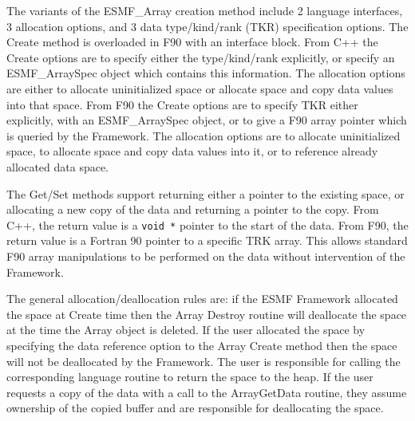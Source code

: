 

The variants of the ESMF\_Array creation method include 2 language interfaces, 
3 allocation options, and 3 data type/kind/rank (TKR) specification options.  
The Create method is overloaded in F90 with an interface block.
From C++ the Create options are to specify
either the type/kind/rank explicitly, or specify an ESMF\_ArraySpec
object which contains this information.  The allocation options 
are either to allocate uninitialized space or allocate space and
copy data values into that space.  
From F90 the Create options
are to specify TKR either explicitly, with an ESMF\_ArraySpec
object, or to give a F90 array pointer which is queried by the
Framework.  The allocation options are to allocate uninitialized
space, to allocate space and copy data values into it, or to
reference already allocated data space.

The Get/Set methods support returning either a pointer to
the existing space, or allocating a new copy of the data
and returning a pointer to the copy.  From C++, the return 
value is a {\tt void *} pointer to the start of the data.
From F90, the return value is a Fortran 90 pointer to a
specific TRK array.  This allows standard F90 array manipulations
to be performed on the data without intervention of the Framework.

The general allocation/deallocation rules are: if the ESMF Framework
allocated the space at Create time then the Array Destroy routine 
will deallocate the space at the time the Array object is deleted.  
If the user allocated the space by specifying the data 
reference option to the Array Create method then  
the space will not
be deallocated by the Framework. The user is responsible
for calling the corresponding language routine to return the
space to the heap.  If the user requests a copy of the data with
a call to the ArrayGetData routine, they assume ownership of
the copied buffer and are responsible for deallocating the space.


